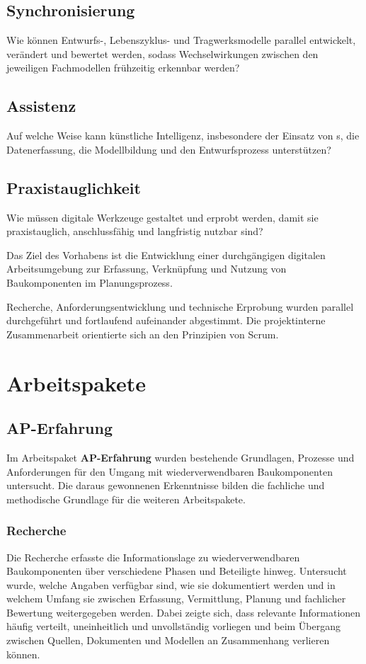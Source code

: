 \documentclass[type=zwischenbericht,theme=dark]{zukunftbau}
\begin{document}
\subsection{Synchronisierung}
Wie können Entwurfs-, Lebenszyklus- und Tragwerksmodelle parallel entwickelt, verändert und bewertet werden, sodass Wechselwirkungen zwischen den jeweiligen Fachmodellen frühzeitig erkennbar werden?

\subsection{Assistenz}
Auf welche Weise kann künstliche Intelligenz, insbesondere der Einsatz von s, die Datenerfassung, die Modellbildung und den Entwurfsprozess unterstützen?

\subsection{Praxistauglichkeit}
Wie müssen digitale Werkzeuge gestaltet und erprobt werden, damit sie praxistauglich, anschlussfähig und langfristig nutzbar sind?

Das Ziel des Vorhabens ist die Entwicklung einer durchgängigen digitalen Arbeitsumgebung zur Erfassung, Verknüpfung und Nutzung von Baukomponenten im Planungsprozess.

Recherche, Anforderungsentwicklung und technische Erprobung wurden parallel durchgeführt und fortlaufend aufeinander abgestimmt. Die projektinterne Zusammenarbeit orientierte sich an den Prinzipien von Scrum.

\section{Arbeitspakete}

\subsection{AP-Erfahrung}

Im Arbeitspaket \textbf{AP-Erfahrung} wurden bestehende Grundlagen, Prozesse und Anforderungen für den Umgang mit wiederverwendbaren Baukomponenten untersucht. Die daraus gewonnenen Erkenntnisse bilden die fachliche und methodische Grundlage für die weiteren Arbeitspakete.

\subsubsection{Recherche}
Die Recherche erfasste die Informationslage zu wiederverwendbaren Baukomponenten über verschiedene Phasen und Beteiligte hinweg. Untersucht wurde, welche Angaben verfügbar sind, wie sie dokumentiert werden und in welchem Umfang sie zwischen Erfassung, Vermittlung, Planung und fachlicher Bewertung weitergegeben werden. Dabei zeigte sich, dass relevante Informationen häufig verteilt, uneinheitlich und unvollständig vorliegen und beim Übergang zwischen Quellen, Dokumenten und Modellen an Zusammenhang verlieren können.
\end{document}
